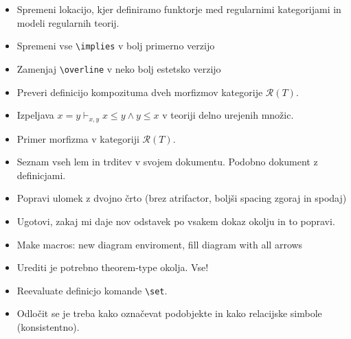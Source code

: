 \documentclass[a4paper]{article}
\begin{document}
    \begin{itemize}
        \item Spremeni lokacijo, kjer definiramo funktorje med regularnimi kategorijami in modeli regularnih teorij.
        \item Spremeni vse \verb|\implies| v bolj primerno verzijo
        \item Zamenjaj \verb|\overline| v neko bolj estetsko verzijo
        \item Preveri definicijo kompozituma dveh morfizmov kategorije $\mathcal{R}(T)$.
        \item Izpeljava $x = y \vdash_{x,y} x \leq y \wedge y \leq x$ v teoriji delno urejenih množic.
        \item Primer morfizma v kategoriji $\mathcal{R}(T)$.
        \item Seznam vseh lem in trditev v svojem dokumentu. Podobno dokument z definicjami.
        \item Popravi ulomek z dvojno črto (brez atrifactor, boljši spacing zgoraj in spodaj)
        \item Ugotovi, zakaj mi daje nov odstavek po vsakem dokaz okolju in to popravi.
        \item Make macros: new diagram enviroment, fill diagram with all arrows
        \item Urediti je potrebno theorem-type okolja. Vse!
        \item Reevaluate definicjo komande \verb|\set|.
        \item Odločit se je treba kako označevat podobjekte in kako relacijske simbole (konsistentno).
    \end{itemize}
\end{document}
